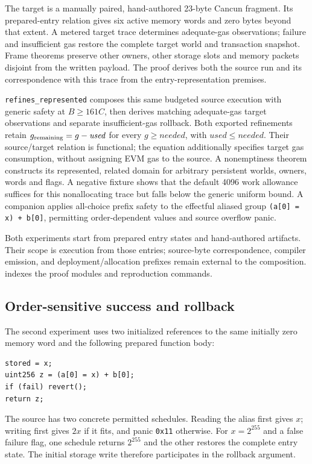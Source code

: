 \documentclass[conference]{IEEEtran}
\newcommand{\code}[1]{\texttt{#1}}
\begin{document}
The target is a manually paired, hand-authored 23-byte Cancun fragment. Its
prepared-entry relation gives six active memory words and zero bytes beyond
that extent. A metered target trace determines adequate-gas observations;
failure and insufficient gas restore the complete target world and transaction
snapshot. Frame theorems preserve other owners, other storage slots and memory
packets disjoint from the written payload. The proof derives both the source
run and its correspondence with this trace from the entry-representation premises.

\code{refines\_represented} composes this same budgeted source execution with
generic safety at $B\geq161C$, then derives matching adequate-gas target
observations and separate insufficient-gas rollback. Both exported refinements
retain $g_{\rm remaining}=g-\mathit{used}$ for every
$g\geq\mathit{needed}$, with $\mathit{used}\leq\mathit{needed}$.
Their source/target relation is functional; the equation additionally specifies
target gas consumption, without assigning EVM gas to the source. A nonemptiness theorem
constructs its represented, related domain for arbitrary persistent worlds,
owners, words and flags. A negative fixture shows that the default 4096 work
allowance suffices for this nonallocating trace but falls below the generic
uniform bound. A companion applies all-choice prefix safety to the
effectful aliased group \code{(a[0] = x) + b[0]}, permitting order-dependent
values and source overflow panic.

Both experiments start from prepared entry states and hand-authored artifacts.
Their scope is execution from those entries; source-byte correspondence,
compiler emission, and deployment/allocation prefixes remain external to the
composition.  indexes the proof modules and reproduction commands.

\subsection{Order-sensitive success and rollback}
The second experiment uses two initialized references to the same initially
zero memory word and the following prepared function body:
\begin{verbatim}
stored = x;
uint256 z = (a[0] = x) + b[0];
if (fail) revert();
return z;
\end{verbatim}
The source has two concrete permitted schedules. Reading the alias first gives
$x$; writing first gives $2x$ if it fits, and panic \code{0x11} otherwise.
For $x=2^{255}$ and a false failure flag, one schedule returns $2^{255}$ and the
other restores the complete entry state. The initial storage write therefore
participates in the rollback argument.
\end{document}
